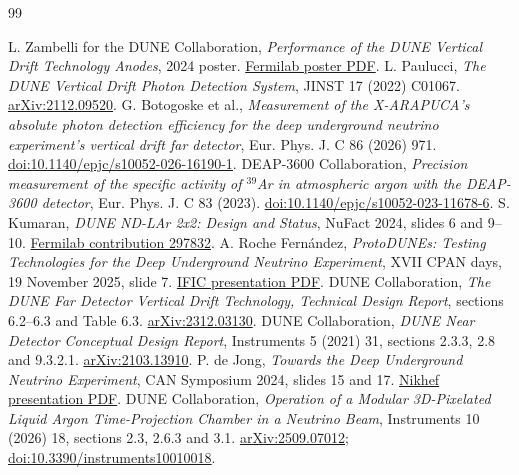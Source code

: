 \documentclass[11pt]{article}
\begin{document}
\clearpage
\begin{thebibliography}{99}
\raggedright
{}
L. Zambelli for the DUNE Collaboration, \emph{Performance of the DUNE Vertical Drift Technology
Anodes}, 2024 poster.
\href{https://lss.fnal.gov/archive/2024/poster/fermilab-poster-24-0328-lbnf.pdf}{Fermilab poster PDF}.
L. Paulucci, \emph{The DUNE Vertical Drift Photon Detection System},
JINST 17 (2022) C01067.
\href{https://arxiv.org/abs/2112.09520}{arXiv:2112.09520}.
G. Botogoske et al., \emph{Measurement of the X-ARAPUCA's absolute photon
detection efficiency for the deep underground neutrino experiment's vertical
drift far detector}, Eur. Phys. J. C 86 (2026) 971.
\href{https://link.springer.com/article/10.1140/epjc/s10052-026-16190-1}{doi:10.1140/epjc/s10052-026-16190-1}.
DEAP-3600 Collaboration, \emph{Precision measurement of the specific activity
of $^{39}$Ar in atmospheric argon with the DEAP-3600 detector},
Eur. Phys. J. C 83 (2023).
\href{https://link.springer.com/article/10.1140/epjc/s10052-023-11678-6}{doi:10.1140/epjc/s10052-023-11678-6}.
S. Kumaran, \emph{DUNE ND-LAr 2x2: Design and Status}, NuFact 2024,
slides 6 and 9--10.
\href{https://indico.fnal.gov/event/63406/contributions/297832/}{Fermilab contribution 297832}.
A. Roche Fern\'andez, \emph{ProtoDUNEs: Testing Technologies for the Deep
Underground Neutrino Experiment}, XVII CPAN days, 19 November 2025, slide 7.
\href{https://indico.ific.uv.es/event/8035/contributions/29121/attachments/14443/21364/CPAN_2025_ProtoDUNEs.pdf}{IFIC presentation PDF}.
DUNE Collaboration, \emph{The DUNE Far Detector Vertical Drift Technology,
Technical Design Report}, sections 6.2--6.3 and Table 6.3.
\href{https://arxiv.org/abs/2312.03130}{arXiv:2312.03130}.
DUNE Collaboration, \emph{DUNE Near Detector Conceptual Design Report},
Instruments 5 (2021) 31, sections 2.3.3, 2.8 and 9.3.2.1.
\href{https://arxiv.org/abs/2103.13910}{arXiv:2103.13910}.
P. de Jong, \emph{Towards the Deep Underground Neutrino Experiment},
CAN Symposium 2024, slides 15 and 17.
\href{https://indico.nikhef.nl/event/5234/contributions/21855/attachments/8564/12354/Towards_DUNE_PdJ.pdf}{Nikhef presentation PDF}.
DUNE Collaboration, \emph{Operation of a Modular 3D-Pixelated Liquid Argon
Time-Projection Chamber in a Neutrino Beam}, Instruments 10 (2026) 18,
sections 2.3, 2.6.3 and 3.1.
\href{https://arxiv.org/abs/2509.07012}{arXiv:2509.07012};
\href{https://doi.org/10.3390/instruments10010018}{doi:10.3390/instruments10010018}.

\end{thebibliography}
\end{document}
